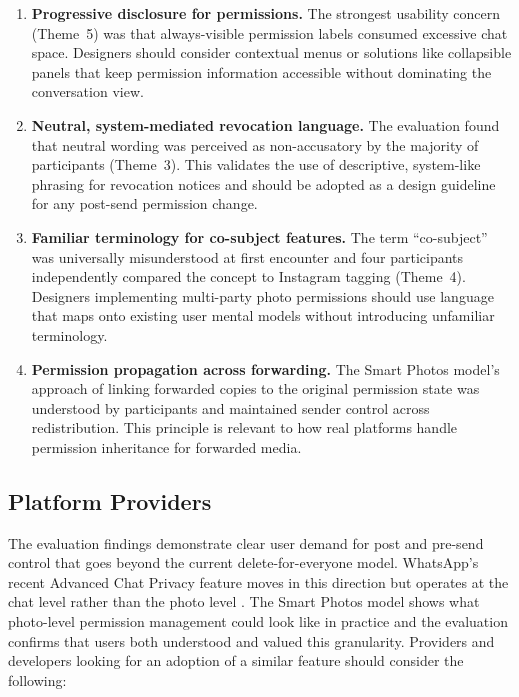 \begin{enumerate}
    \item \textbf{Progressive disclosure for permissions.} The strongest usability concern (Theme~5) was that always-visible permission labels consumed excessive chat space. Designers should consider contextual menus or solutions like collapsible panels that keep permission information accessible without dominating the conversation view.
    \item \textbf{Neutral, system-mediated revocation language.} The evaluation found that neutral wording was perceived as non-accusatory by the majority of participants (Theme~3). This validates the use of descriptive, system-like phrasing for revocation notices and should be adopted as a design guideline for any post-send permission change.
    \item \textbf{Familiar terminology for co-subject features.} The term ``co-subject'' was universally misunderstood at first encounter and four participants independently compared the concept to Instagram tagging (Theme~4). Designers implementing multi-party photo permissions should use language that maps onto existing user mental models without introducing unfamiliar terminology.
    \item \textbf{Permission propagation across forwarding.} The Smart Photos model's approach of linking forwarded copies to the original permission state was understood by participants and maintained sender control across redistribution. This principle is relevant to how real platforms handle permission inheritance for forwarded media.
\end{enumerate}

\subsection*{Platform Providers}

The evaluation findings demonstrate clear user demand for post and pre-send control that goes beyond the current delete-for-everyone model. WhatsApp's recent Advanced Chat Privacy feature moves in this direction but operates at the chat level rather than the photo level \cite{whatsapp_advanced_chat_privacy}. The Smart Photos model shows what photo-level permission management could look like in practice and the evaluation confirms that users both understood and valued this granularity. Providers and developers looking for an adoption of a similar feature should consider the following:

